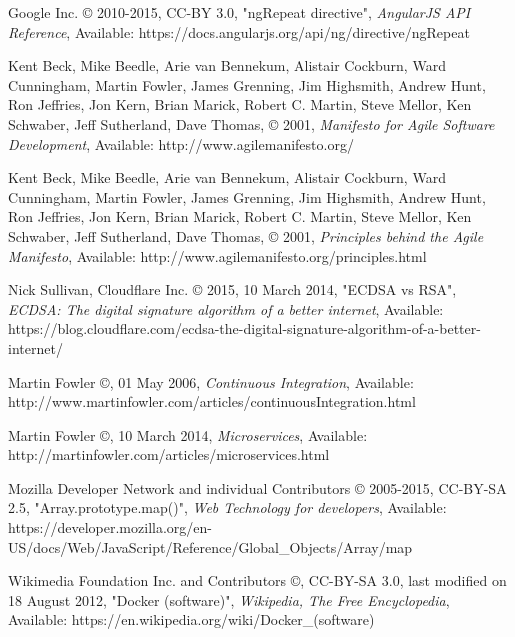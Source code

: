 \begin{thebibliography}{999}
\raggedright
Google Inc. © 2010-2015, CC-BY 3.0, "ngRepeat directive",
{\em AngularJS API Reference},
Available: https://docs.angularjs.org/api/ng/directive/ngRepeat

\raggedright
Kent Beck, Mike Beedle, Arie van Bennekum, Alistair Cockburn, Ward Cunningham,
Martin Fowler, James Grenning, Jim Highsmith, Andrew Hunt, Ron Jeffries, Jon
Kern, Brian Marick, Robert C. Martin, Steve Mellor, Ken Schwaber, Jeff
Sutherland, Dave Thomas, © 2001,
{\em Manifesto for Agile Software Development},
Available: http://www.agilemanifesto.org/

\raggedright
Kent Beck, Mike Beedle, Arie van Bennekum, Alistair Cockburn, Ward Cunningham,
Martin Fowler, James Grenning, Jim Highsmith, Andrew Hunt, Ron Jeffries, Jon
Kern, Brian Marick, Robert C. Martin, Steve Mellor, Ken Schwaber, Jeff
Sutherland, Dave Thomas, © 2001,
{\em Principles behind the Agile Manifesto},
Available: http://www.agilemanifesto.org/principles.html

\raggedright
Nick Sullivan, Cloudflare Inc. © 2015, 10 March 2014, "ECDSA vs RSA",
{\em ECDSA: The digital signature algorithm of a better internet},
Available: https://blog.cloudflare.com/ecdsa-the-digital-signature-algorithm-of-a-better-internet/

\raggedright
Martin Fowler ©, 01 May 2006,
{\em Continuous Integration},
Available: http://www.martinfowler.com/articles/continuousIntegration.html

\raggedright
Martin Fowler ©, 10 March 2014,
{\em Microservices},
Available: http://martinfowler.com/articles/microservices.html

\raggedright
Mozilla Developer Network and individual Contributors © 2005-2015, CC-BY-SA 2.5, "Array.prototype.map()",
{\em Web Technology for developers},
Available: https://developer.mozilla.org/en-US/docs/Web/JavaScript/Reference/Global\_Objects/Array/map

\raggedright
Wikimedia Foundation Inc. and Contributors ©, CC-BY-SA 3.0,
last modified on 18 August 2012, "Docker (software)",
{\em Wikipedia, The Free Encyclopedia},
Available: https://en.wikipedia.org/wiki/Docker\_(software)

\end{thebibliography}
